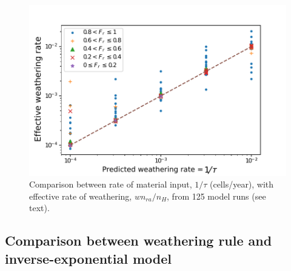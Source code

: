 \documentclass[esurf, manuscript]{copernicus}
\begin{document}
\begin{figure}[t]
\includegraphics[width=12cm]{Figures/wxing_vs_uplift.pdf}
\caption{Comparison between rate of material input, $1/\tau$ (cells/year), with effective rate of weathering, $w n_{ra}/n_H$, from 125 model runs (see text).}
\label{wxinguplift}
\end{figure}


\subsection{Comparison between weathering rule and inverse-exponential model}
\end{document}
